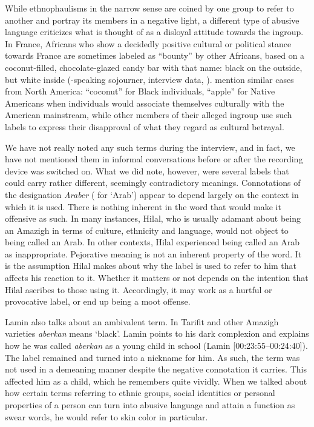 \documentclass[output=paper,colorlinks,citecolor=brown]{langscibook}
\begin{document}
While ethnophaulisms in the narrow sense are coined by one group to refer to another and portray its members in a negative light, a different type of abusive language criticizes what is thought of as a disloyal attitude towards the ingroup. In France, Africans who show a decidedly positive cultural or political stance towards France are sometimes labeled as ``bounty'' by other Africans, based on a coconut-filled, chocolate-glazed candy bar with that name: black on the outside, but white inside (-speaking sojourner, interview data, \citealt{petrou2023}). \citet[639]{keblusek_giles_maass2017} mention similar cases from North America: ``coconut'' for Black individuals, ``apple'' for Native Americans when individuals would associate themselves culturally with the American mainstream, while other members of their alleged ingroup use such labels to express their disapproval of what they regard as cultural betrayal. 

We have not really noted any such terms during the interview, and in fact, we have not mentioned them in informal conversations before or after the recording device was switched on. What we did note, however, were several labels that could carry rather different, seemingly contradictory meanings. Connotations of the designation \textit{Araber} ( for `Arab') appear to depend largely on the context in which it is used. There is nothing inherent in the word that would make it offensive as such. In many instances, Hilal, who is usually adamant about being an Amazigh in terms of culture, ethnicity and language, would not object to being called an Arab. In other contexts, Hilal experienced being called an Arab as inappropriate. Pejorative meaning is not an inherent property of the word. It is the assumption Hilal makes about why the label is used to refer to him that affects his reaction to it. Whether it matters or not depends on the intention that Hilal ascribes to those using it. Accordingly, it may work as a hurtful or provocative label, or end up being a moot offense. 

\begin{sloppypar}
Lamin also talks about an ambivalent term. In Tarifit and other Amazigh varieties \textit{aberkan} means `black'. Lamin points to his dark complexion and explains how he was called \textit{aberkan} as a young child in school (Lamin [00:23:55--00:24:40]). The label remained and turned into a nickname for him. As such, the term was not used in a demeaning manner despite the negative connotation it carries. This affected him as a child, which he remembers quite vividly. When we talked about how certain terms referring to ethnic groups, social identities or personal properties of a person can turn into abusive language and attain a function as swear words, he would refer to skin color in particular. 
\end{sloppypar}
\end{document}
